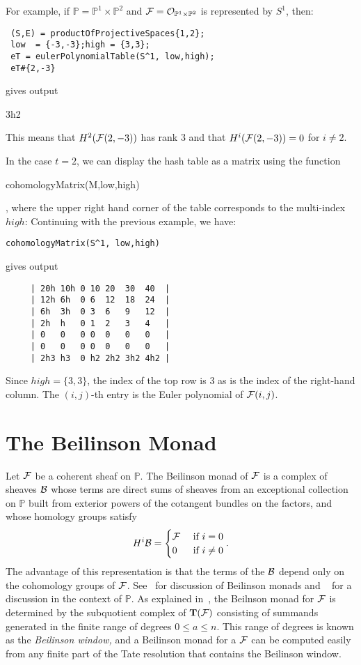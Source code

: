\documentclass[twoside,12pt, leqno]{amsart}
\def\PP{{\mathbb P}}
\def\bT{{\bf T}}
\begin{document}
For example,  if $\PP=\PP^1\times \PP^2$ and   $\sF = \sO_{\PP^1\times \PP^2}$ is represented by $S^1$, then:
{\small \begin{verbatim}
 (S,E) = productOfProjectiveSpaces{1,2};
 low  = {-3,-3};high = {3,3};
 eT = eulerPolynomialTable(S^1, low,high);
 eT#{2,-3}
\end{verbatim}}
\noindent gives output
\begin{verb}
3h2 
\end{verb}
This means that $H^2({\mathcal F}(2,-3))$ has rank $3$ and that $H^i({\mathcal F}(2,-3)) = 0$ for $i\ne 2$.

In the case $t=2$, we can display the hash table as a matrix using the function
\begin{verb}
 cohomologyMatrix(M,low,high)
\end{verb},
where the upper right hand corner of the table corresponds to the multi-index $high$: Continuing with the previous example,
we have:
{\small \begin{verbatim}
cohomologyMatrix(S^1, low,high)
\end{verbatim}}
\noindent gives output
{\small 
\begin{verbatim}
     | 20h 10h 0 10 20  30  40  |
     | 12h 6h  0 6  12  18  24  |
     | 6h  3h  0 3  6   9   12  |
     | 2h  h   0 1  2   3   4   |
     | 0   0   0 0  0   0   0   |
     | 0   0   0 0  0   0   0   |
     | 2h3 h3  0 h2 2h2 3h2 4h2 |
\end{verbatim}}
\noindent Since $high = \{3,3\}$, the index of the top row is 3 as is the index of the right-hand column. 
The $(i,j)$-th entry is the Euler polynomial of ${\mathcal F}(i,j)$. 

\section{The Beilinson Monad}\label{sec:beilinson monad}
Let ${\mathcal F}$ be a coherent sheaf on $\PP$.  The Beilinson monad of ${\mathcal F}$ is a complex of sheaves ${\mathcal B}$ whose terms are direct sums of sheaves from an exceptional collection on $\PP$ built from exterior powers of the cotangent bundles on the factors, and whose homology groups satisfy
\[
H^{i}{\mathcal B} = \begin{cases} {\mathcal F} & \text{ if } i=0\\
0& \text{ if } i \ne 0 
\end{cases}.
\]
The advantage of this representation is that the terms of the ${\mathcal B}$ depend only on the cohomology groups of
${\mathcal F}$. See~\cite{beilinson,AO,EFS,Huy} for discussion of Beilinson monads and ~\cite[\S2]{EES} for a discussion in the context of $\PP$.  As explained in~\cite[\S2]{EES}, the Beilnson monad for ${\mathcal F}$ is determined by the subquotient complex of $\bT(\sF)$ consisting of summands generated in the finite range of degrees $0\leq a \leq n$.  This range of degrees is known as the {\em Beilinson window,} and a Beilinson monad for a ${\mathcal F}$ can be  computed easily from any finite part of the Tate resolution that contains the Beilinson window.  
\end{document}
